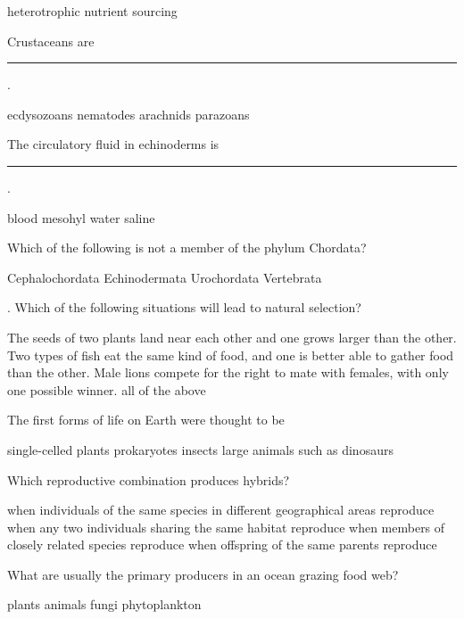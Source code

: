\documentclass[12pt,addpoints]{exam}
\begin{document}
\begin{questions}
\begin{choices}
			\choice heterotrophic nutrient sourcing
		\end{choices}
		\question Crustaceans are \noindent\rule{1in}{0.4pt}. \\
		\begin{oneparchoices}
			\choice ecdysozoans
			\choice nematodes
			\choice arachnids
			\choice parazoans
		\end{oneparchoices}
		\question The circulatory fluid in echinoderms is\noindent\rule{1in}{0.4pt}.
		\begin{oneparchoices}
			\choice blood
			\choice mesohyl
			\choice water
			\choice saline
		\end{oneparchoices}
		\question Which of the following is not a member of the phylum Chordata?
		\begin{oneparchoices}
			\choice Cephalochordata
			\choice Echinodermata
			\choice Urochordata
			\choice Vertebrata
		\end{oneparchoices}
		\question . Which of the following situations will lead to natural selection?
		\begin{choices}
			\choice The seeds of two plants land near each other and one grows larger than the other.
			\choice Two types of fish eat the same kind of food, and one is better able to gather food than the other.
			\choice Male lions compete for the right to mate with females, with only one possible winner.
			\choice all of the above
		\end{choices}
		\question The first forms of life on Earth were thought to be 
		\begin{choices}
			\choice	single-celled plants
			\choice prokaryotes
			\choice insects
			\choice large animals such as dinosaurs
		\end{choices}
		\question Which reproductive combination produces hybrids?
		\begin{choices}
			\choice when individuals of the same species in different geographical areas reproduce
			\choice when any two individuals sharing the same habitat reproduce
			\choice when members of closely related species reproduce
			\choice when offspring of the same parents reproduce
		\end{choices}
		\question What are usually the primary producers in an ocean grazing food web? \\
		\begin{oneparchoices}
			\choice plants
			\choice animals
			\choice fungi
			\choice phytoplankton
		\end{oneparchoices}
	\begin{center}

\end{center}
\end{questions}
\end{document}
